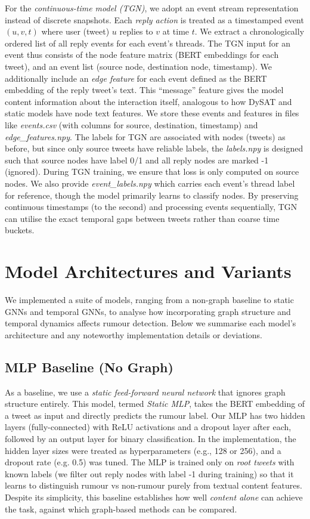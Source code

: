 \documentclass{cshonours}
\begin{document}
For the \emph{continuous-time model (TGN)}, we adopt an event stream representation instead of discrete snapshots. Each \emph{reply action} is treated as a timestamped event $(u, v, t)$ where user (tweet) $u$ replies to $v$ at time $t$. We extract a chronologically ordered list of all reply events for each event's threads. The TGN input for an event thus consists of the node feature matrix (BERT embeddings for each tweet), and an event list (source node, destination node, timestamp). We additionally include an \emph{edge feature} for each event defined as the BERT embedding of the reply tweet's text. This ``message'' feature gives the model content information about the interaction itself, analogous to how DySAT and static models have node text features. We store these events and features in files like \emph{events.csv} (with columns for source, destination, timestamp) and \emph{edge\_features.npy}. The labels for TGN are associated with nodes (tweets) as before, but since only source tweets have reliable labels, the \emph{labels.npy} is designed such that source nodes have label 0/1 and all reply nodes are marked -1 (ignored). During TGN training, we ensure that loss is only computed on source nodes. We also provide \emph{event\_labels.npy} which carries each event's thread label for reference, though the model primarily learns to classify nodes. By preserving continuous timestamps (to the second) and processing events sequentially, TGN can utilise the exact temporal gaps between tweets rather than coarse time buckets.

\section{Model Architectures and Variants}

We implemented a suite of models, ranging from a non-graph baseline to static GNNs and temporal GNNs, to analyse how incorporating graph structure and temporal dynamics affects rumour detection. Below we summarise each model's architecture and any noteworthy implementation details or deviations.

\subsection{MLP Baseline (No Graph)}

As a baseline, we use a \emph{static feed-forward neural network} that ignores graph structure entirely. This model, termed \emph{Static MLP}, takes the BERT embedding of a tweet as input and directly predicts the rumour label. Our MLP has two hidden layers (fully-connected) with ReLU activations and a dropout layer after each, followed by an output layer for binary classification. In the implementation, the hidden layer sizes were treated as hyperparameters (e.g., 128 or 256), and a dropout rate (e.g. 0.5) was tuned. The MLP is trained only on \emph{root tweets} with known labels (we filter out reply nodes with label -1 during training) so that it learns to distinguish rumour vs non-rumour purely from textual content features. Despite its simplicity, this baseline establishes how well \emph{content alone} can achieve the task, against which graph-based methods can be compared.
\end{document}

